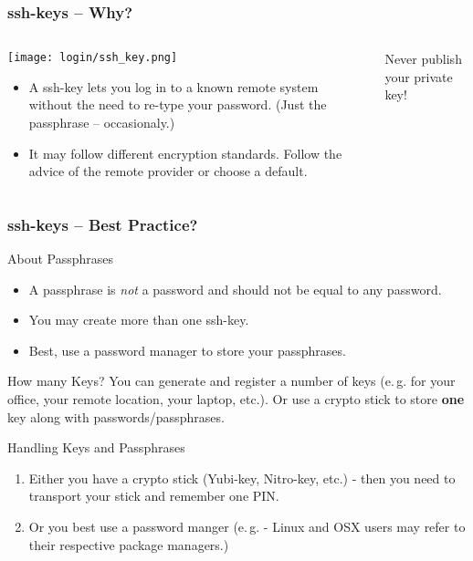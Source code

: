 \begin{frame}
	\frametitle{ssh-keys -- Why?}
	\begin{columns}[t]
		\begin{column}{.5\textwidth}
			\texttt{[image: login/ssh\_key.png]}
			\begin{itemize}
				\item A ssh-key lets you log in to a known remote system without the need to re-type your password. (Just the passphrase -- occasionaly.)
				\item It may follow different encryption standards. Follow the advice of the remote provider or choose a default.
			\end{itemize}
		\end{column}
		\begin{column}{.5\textwidth}
			\begin{warning}
				Never publish your private key!
			\end{warning}
			\vfill
		\end{column}
	\end{columns}
\end{frame}

\begin{frame}
	\frametitle{ssh-keys -- Best Practice?}
	\begin{exampleblock}{About Passphrases}
		\begin{itemize}[<+->]\footnotesize
			\item A passphrase is \emph{not} a password and should not be equal to any password.
			\item You may create more than one ssh-key.
			\item Best, use a password manager to store your passphrases.
		\end{itemize}
	\end{exampleblock}
	\pause[\thebeamerpauses]
	\begin{exampleblock}{How many Keys?}\footnotesize
		You can generate and register a number of keys (e.\,g. for your office, your remote location, your laptop, etc.). Or use a crypto stick to store \textbf{one} key along with passwords/passphrases.
	\end{exampleblock}
	\pause
	\begin{exampleblock}{Handling Keys and Passphrases}
		\begin{enumerate}\footnotesize
			\item Either you have a crypto stick (Yubi-key, Nitro-key, etc.) - then you need to transport your stick and remember one PIN.
			\item Or you best use a password manger (e.\,g.  - Linux and OSX users may refer to their respective package managers.)
		\end{enumerate}
	\end{exampleblock}
\end{frame}

